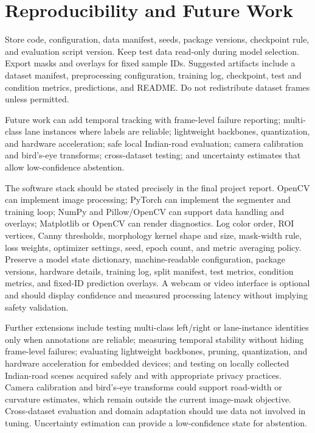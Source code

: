 \documentclass[10pt,a4paper,twocolumn]{article}
\begin{document}
\section{Reproducibility and Future Work}\label{sec:repro}
Store code, configuration, data manifest, seeds, package versions, checkpoint rule, and evaluation script version. Keep test data read-only during model selection. Export masks and overlays for fixed sample IDs. Suggested artifacts include a dataset manifest, preprocessing configuration, training log, checkpoint, test and condition metrics, predictions, and README. Do not redistribute dataset frames unless permitted.

Future work can add temporal tracking with frame-level failure reporting; multi-class lane instances where labels are reliable; lightweight backbones, quantization, and hardware acceleration; safe local Indian-road evaluation; camera calibration and bird's-eye transforms; cross-dataset testing; and uncertainty estimates that allow low-confidence abstention.

The software stack should be stated precisely in the final project report. OpenCV can implement image processing; PyTorch can implement the segmenter and training loop; NumPy and Pillow/OpenCV can support data handling and overlays; Matplotlib or OpenCV can render diagnostics. Log color order, ROI vertices, Canny thresholds, morphology kernel shape and size, mask-width rule, loss weights, optimizer settings, seed, epoch count, and metric averaging policy. Preserve a model state dictionary, machine-readable configuration, package versions, hardware details, training log, split manifest, test metrics, condition metrics, and fixed-ID prediction overlays. A webcam or video interface is optional and should display confidence and measured processing latency without implying safety validation.

Further extensions include testing multi-class left/right or lane-instance identities only when annotations are reliable; measuring temporal stability without hiding frame-level failures; evaluating lightweight backbones, pruning, quantization, and hardware acceleration for embedded devices; and testing on locally collected Indian-road scenes acquired safely and with appropriate privacy practices. Camera calibration and bird's-eye transforms could support road-width or curvature estimates, which remain outside the current image-mask objective. Cross-dataset evaluation and domain adaptation should use data not involved in tuning. Uncertainty estimation can provide a low-confidence state for abstention.
\end{document}
